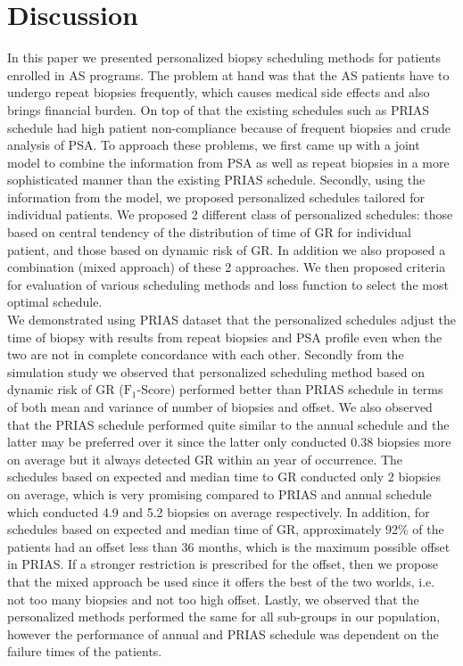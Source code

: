 
\section{Discussion}
\label{sec: discussion}
In this paper we presented personalized biopsy scheduling methods for patients enrolled in AS programs. The problem at hand was that the AS patients have to undergo repeat biopsies frequently, which causes medical side effects and also brings financial burden. On top of that the existing schedules such as PRIAS schedule had high patient non-compliance because of frequent biopsies and crude analysis of PSA. To approach these problems, we first came up with a joint model to combine the information from PSA as well as repeat biopsies in a more sophisticated manner than the existing PRIAS schedule. Secondly, using the information from the model, we proposed personalized schedules tailored for individual patients. We proposed 2 different class of personalized schedules: those based on central tendency of the distribution of time of GR for individual patient, and those based on dynamic risk of GR. In addition we also proposed a combination (mixed approach) of these 2 approaches. We then proposed criteria for evaluation of various scheduling methods and loss function to select the most optimal schedule.\\

We demonstrated using PRIAS dataset that the personalized schedules adjust the time of biopsy with results from repeat biopsies and PSA profile even when the two are not in complete concordance with each other. Secondly from the simulation study we observed that personalized scheduling method based on dynamic risk of GR ($\text{F}_1$-Score) performed better than PRIAS schedule in terms of both mean and variance of number of biopsies and offset. We also observed that the PRIAS schedule performed quite similar to the annual schedule and the latter may be preferred over it since the latter only conducted 0.38 biopsies more on average but it always detected GR within an year of occurrence. The schedules based on expected and median time to GR conducted only 2 biopsies on average, which is very promising compared to PRIAS and annual schedule which conducted 4.9 and 5.2 biopsies on average respectively. In addition, for schedules based on expected and median time of GR, approximately 92\% of the patients had an offset less than 36 months, which is the maximum possible offset in PRIAS. If a stronger restriction is prescribed for the offset, then we propose that the mixed approach be used since it offers the best of the two worlds, i.e. not too many biopsies and not too high offset. Lastly, we observed that the personalized methods performed the same for all sub-groups in our population, however the performance of annual and PRIAS schedule was dependent on the failure times of the patients.\\

